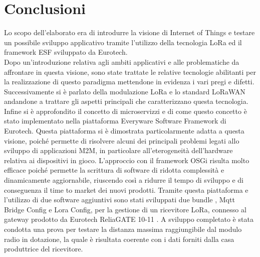 \chapter{Conclusioni}
Lo scopo dell’elaborato era di introdurre la visione di Internet of Things e
testare un possibile sviluppo applicativo tramite l'utilizzo della tecnologia  
LoRa ed il framework ESF sviluppato da Eurotech.\\
Dopo un'introduzione relativa agli ambiti applicativi e alle problematiche da
affrontare in questa visione, sono state trattate le relative tecnologie
abilitanti per la realizzazione di  questo paradigma mettendone in evidenza i
vari pregi e difetti. 
Successivamente si è parlato della modulazione LoRa e lo standard LoRaWAN
andandone a trattare gli aspetti principali che caratterizzano questa
tecnologia.
Infine si è approfondito il concetto di microservizzi e di come questo concetto
è stato implementato nella piattaforma Everyware Software Framework di Eurotech.
Questa piattaforma si è dimostrata
particolarmente adatta a questa visione, poiché permette di risolvere alcuni
dei principali problemi legati allo sviluppo di applicazioni M2M, in particolare all’eterogeneità
dell’hardware relativa ai dispositivi in gioco. 
L’approccio con il framework OSGi risulta molto efficace poiché permette la
scrittura di  software di  ridotta complessità e dinamicamente aggiornabile, 
riuscendo così a ridurre il tempo di sviluppo e di conseguenza il time to market
dei nuovi prodotti.
Tramite questa piattaforma e l'utilizzo di due software aggiuntivi 
sono stati sviluppati due bundle , Mqtt Bridge Config e Lora Config,
per la gestione di un ricevitore LoRa, connesso al gateway prodotto da Eurotech ReliaGATE 10-11 
. A sviluppo completato è stata condotta una prova per testare la
distanza massima raggiungibile dal modulo radio in dotazione, la quale è
risultata coerente con i dati forniti dalla casa produttrice del ricevitore.
